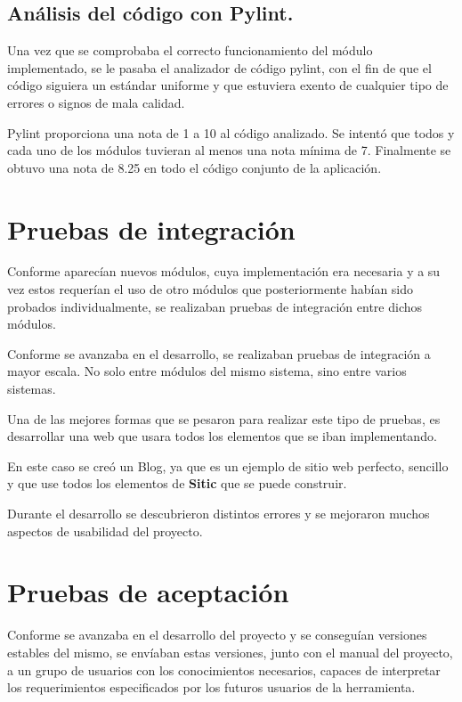 \subsection{Análisis del código con Pylint.}

Una vez que se comprobaba el correcto funcionamiento del módulo implementado, se le pasaba el analizador de código pylint, con el
fin de que el código siguiera un estándar uniforme y que estuviera exento de cualquier tipo de errores o signos de mala calidad.

Pylint proporciona una nota de 1 a 10 al código analizado. Se intentó que todos y cada uno de los módulos tuvieran al menos
una nota mínima de 7. Finalmente se obtuvo una nota de 8.25 en todo el código conjunto de la aplicación.

\section{Pruebas de integración}

Conforme aparecían nuevos módulos, cuya implementación era necesaria y a su vez estos requerían el uso de otro módulos que
posteriormente habían sido probados individualmente, se realizaban pruebas de integración entre dichos módulos.

Conforme se avanzaba en el desarrollo, se realizaban pruebas de integración a mayor escala. No solo entre módulos
del mismo sistema, sino entre varios sistemas.

Una de las mejores formas que se pesaron para realizar este tipo de pruebas, es desarrollar una web que usara todos los elementos
que se iban implementando.

En este caso se creó un Blog, ya que es un ejemplo de sitio web perfecto, sencillo y que use 
todos los elementos de \textbf{Sitic} que se puede construir.

Durante el desarrollo se descubrieron distintos errores y se mejoraron muchos aspectos de usabilidad del proyecto.

\section{Pruebas de aceptación}

Conforme se avanzaba en el desarrollo del proyecto y se conseguían versiones estables del mismo, se
envíaban estas versiones, junto con el manual del proyecto, a un grupo de usuarios con los conocimientos
necesarios, capaces de interpretar los requerimientos especificados por los futuros usuarios de la herramienta.

